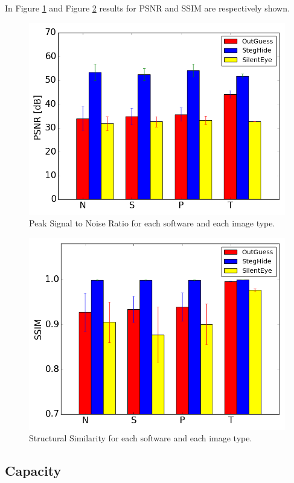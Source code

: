 \documentclass[11pt]{article}
\begin{document}
In Figure \ref{Fig:PSNR} and Figure \ref{Fig:SSIM} results for PSNR and SSIM are respectively shown.

\begin{figure}[h!]
\centering
\includegraphics[scale=0.4]{PSNR.png}
\caption{Peak Signal to Noise Ratio for each software and each image type.}
\label{Fig:PSNR}
\end{figure}

\begin{figure}[h!]
\centering
\includegraphics[scale=0.4]{SSIM.png}
\caption{Structural Similarity for each software and each image type.}
\label{Fig:SSIM}
\end{figure}

\subsection{Capacity}
\end{document}
